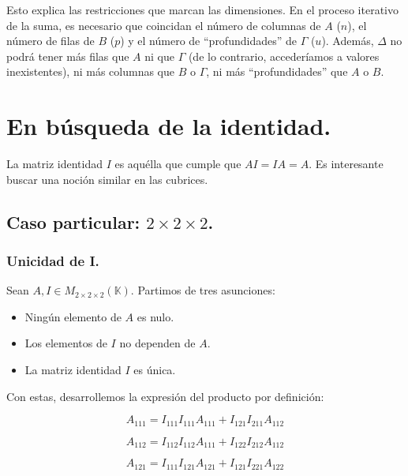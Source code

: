 \documentclass[a4paper, titlepage]{article}
\begin{document}
Esto explica las restricciones que marcan las dimensiones. En el proceso iterativo de la suma, es necesario que coincidan el número de columnas de $A$ ($n$), el número de filas de $B$ ($p$) y el número de ``profundidades'' de $\Gamma$ ($u$). Además, $\Delta$ no podrá tener más filas que $A$ ni que $\Gamma$ (de lo contrario, accederíamos a valores inexistentes), ni más columnas que $B$ o $\Gamma$, ni más ``profundidades'' que $A$ o $B$.


\section{En búsqueda de la identidad.}

La matriz identidad $I$ es aquélla que cumple que $AI = IA = A$. Es interesante buscar una noción similar en las cubrices.

\subsection{Caso particular: $2\times 2\times 2$.}

\subsubsection{Unicidad de I.}

Sean $A, I \in M_{2\times 2\times 2} (\mathbb{K})$. Partimos de tres asunciones:

\begin{itemize}
	\item Ningún elemento de $A$ es nulo.
	\item Los elementos de $I$ no dependen de $A$.
	\item La matriz identidad $I$ es única.
\end{itemize}

Con estas, desarrollemos la expresión del producto por definición:

\begin{equation}
A_{111} = I_{111} I_{111} A_{111} + I_{121} I_{211} A_{112}
\end{equation}

\begin{equation}
A_{112} = I_{112} I_{112} A_{111} + I_{122} I_{212} A_{112}
\end{equation}

\begin{equation}
A_{121} = I_{111} I_{121} A_{121} + I_{121} I_{221} A_{122}
\end{equation}
\end{document}
